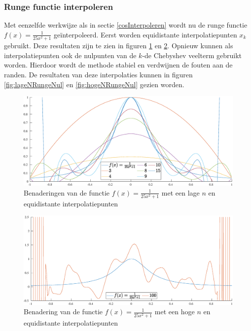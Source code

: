 \documentclass[a4paper, 12pt, titlepage, fleqn]{article}
\begin{document}
\subsubsection{Runge functie interpoleren}
Met eenzelfde werkwijze als in sectie \ref{cosInterpoleren} wordt nu de runge functie $f(x) = \frac{1}{25x^2+1}$ ge\"interpoleerd. Eerst worden equidistante interpolatiepunten $x_k$ gebruikt. Deze resultaten zijn te zien in figuren \ref{fig:lageNRungeEqui} en \ref{fig:hogeNRungeEqui}. Opnieuw kunnen als interpolatiepunten ook de nulpunten van de $k$-de Chebyshev veelterm gebruikt worden. Hierdoor wordt de methode stabiel en verdwijnen de fouten aan de randen. De resultaten van deze interpolaties kunnen in figuren \ref{fig:lageNRungeNul} en \ref{fig:hogeNRungeNul} gezien worden.

\begin{figure}
\centering
\includegraphics[scale=0.4]{../Afbeeldingen/runge_equi_laag.eps}
\caption{Benaderingen van de functie $f(x) = \frac{1}{25x^2+1}$ met een lage $n$ en equidistante interpolatiepunten}
\label{fig:lageNRungeEqui}
\end{figure}

\begin{figure}
\centering
\includegraphics[scale=0.4]{../Afbeeldingen/runge_equi_hoog.eps}
\caption{Benadering van de functie $f(x) = \frac{1}{25x^2+1}$ met een hoge $n$ en equidistante interpolatiepunten}
\label{fig:hogeNRungeEqui}
\end{figure}
\end{document}

